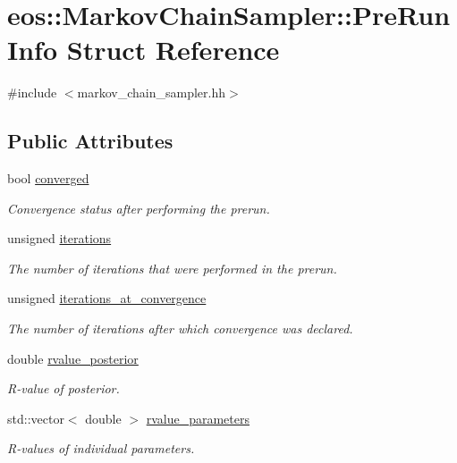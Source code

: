 \hypertarget{structeos_1_1MarkovChainSampler_1_1PreRunInfo}{
\section{eos::MarkovChainSampler::PreRunInfo Struct Reference}
\label{structeos_1_1MarkovChainSampler_1_1PreRunInfo}
}


{\ttfamily \#include $<$markov\_\-chain\_\-sampler.hh$>$}\subsection*{Public Attributes}
\begin{DoxyCompactItemize}
\item 
bool \hyperlink{structeos_1_1MarkovChainSampler_1_1PreRunInfo_a182be4f50ae9368aeee0303b4fd29b51}{converged}
\begin{DoxyCompactList}\small\item\em Convergence status after performing the prerun. \item\end{DoxyCompactList}\item 
unsigned \hyperlink{structeos_1_1MarkovChainSampler_1_1PreRunInfo_a40e24d2a409ae1d2a90c1a49b972b654}{iterations}
\begin{DoxyCompactList}\small\item\em The number of iterations that were performed in the prerun. \item\end{DoxyCompactList}\item 
unsigned \hyperlink{structeos_1_1MarkovChainSampler_1_1PreRunInfo_a1f821da9adca5ee92802e51fcb372278}{iterations\_\-at\_\-convergence}
\begin{DoxyCompactList}\small\item\em The number of iterations after which convergence was declared. \item\end{DoxyCompactList}\item 
double \hyperlink{structeos_1_1MarkovChainSampler_1_1PreRunInfo_a7bf1e8c85dc0ae0e72e64737a033c8c2}{rvalue\_\-posterior}
\begin{DoxyCompactList}\small\item\em R-\/value of posterior. \item\end{DoxyCompactList}\item 
std::vector$<$ double $>$ \hyperlink{structeos_1_1MarkovChainSampler_1_1PreRunInfo_a568ebe4315e338e9e6ea690c268a964b}{rvalue\_\-parameters}
\begin{DoxyCompactList}\small\item\em R-\/values of individual parameters. \item\end{DoxyCompactList}\end{DoxyCompactItemize}


